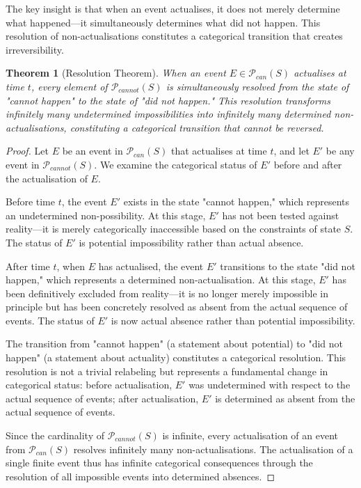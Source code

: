 \documentclass[12pt,a4paper]{article}
\newtheorem{theorem}{Theorem}[section]
\theoremstyle{definition}
\theoremstyle{remark}
\begin{document}
The key insight is that when an event actualises, it does not merely determine what happened—it simultaneously determines what did not happen. This resolution of non-actualisations constitutes a categorical transition that creates irreversibility.

\begin{theorem}[Resolution Theorem]
\label{thm:resolution}
When an event $E \in \mathcal{P}_{can}(S)$ actualises at time $t$, every element of $\mathcal{P}_{cannot}(S)$ is simultaneously resolved from the state of "cannot happen" to the state of "did not happen." This resolution transforms infinitely many undetermined impossibilities into infinitely many determined non-actualisations, constituting a categorical transition that cannot be reversed.
\end{theorem}

\begin{proof}
Let $E$ be an event in $\mathcal{P}_{can}(S)$ that actualises at time $t$, and let $E'$ be any event in $\mathcal{P}_{cannot}(S)$. We examine the categorical status of $E'$ before and after the actualisation of $E$.

Before time $t$, the event $E'$ exists in the state "cannot happen," which represents an undetermined non-possibility. At this stage, $E'$ has not been tested against reality—it is merely categorically inaccessible based on the constraints of state $S$. The status of $E'$ is potential impossibility rather than actual absence.

After time $t$, when $E$ has actualised, the event $E'$ transitions to the state "did not happen," which represents a determined non-actualisation. At this stage, $E'$ has been definitively excluded from reality—it is no longer merely impossible in principle but has been concretely resolved as absent from the actual sequence of events. The status of $E'$ is now actual absence rather than potential impossibility.

The transition from "cannot happen" (a statement about potential) to "did not happen" (a statement about actuality) constitutes a categorical resolution. This resolution is not a trivial relabeling but represents a fundamental change in categorical status: before actualisation, $E'$ was undetermined with respect to the actual sequence of events; after actualisation, $E'$ is determined as absent from the actual sequence of events.

Since the cardinality of $\mathcal{P}_{cannot}(S)$ is infinite, every actualisation of an event from $\mathcal{P}_{can}(S)$ resolves infinitely many non-actualisations. The actualisation of a single finite event thus has infinite categorical consequences through the resolution of all impossible events into determined absences.
\end{proof}
\end{document}
